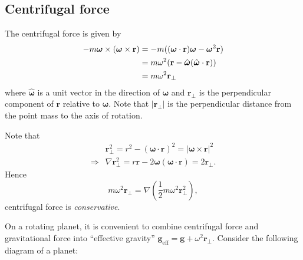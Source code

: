 \subsection{Centrifugal force}
The centrifugal force is given by 
\begin{align*}
    -m\boldsymbol{\omega} \times (\boldsymbol{\omega} \times \mathbf{r}) &= -m((\boldsymbol{\omega}\cdot \mathbf{r})\boldsymbol{\omega}-\boldsymbol{\omega}^2 \mathbf{r})\\ 
    &= m \omega^2({\bf r} - \hat{\boldsymbol{\omega}}(\hat{\boldsymbol{\omega}} \cdot \mathbf{r}))\\ 
    &= m \omega^2 \mathbf{r}_{\perp}
\end{align*}
where $ \hat{\boldsymbol{\omega}} $ is a unit vector in the direction of $ \boldsymbol{\omega} $ and $ \mathbf{r}_{\perp } $ is the perpendicular component of $ \mathbf{r} $ relative to $ \boldsymbol{\omega} $. Note that $ |\mathbf{r}_{\perp }|  $ is the perpendicular distance from the point mass to the axis of rotation.
\begin{center}
\end{center}
Note that
\begin{align*}
    & \mathbf{r}_\perp^2 = r^2-(\boldsymbol{\omega}\cdot \mathbf{r})^2 = |\boldsymbol{\omega}\times \mathbf{r}|^2\\ 
    \Longrightarrow & \nabla \mathbf{r}_\perp^2 = r \mathbf{r} - 2 \boldsymbol{\omega} (\boldsymbol{\omega}\cdot \mathbf{r}) = 2 \mathbf{r}_\perp.
\end{align*}
Hence 
\[
    m \omega^2 \mathbf{r}_{\perp} = \nabla \left( \frac{1}{2}m \omega^2 \mathbf{r}_\perp^2 \right),
\]
centrifugal force is \textit{conservative}. 

On a rotating planet, it is convenient to combine centrifugal force and gravitational force into ``effective gravity'' $ \mathbf{g}_{\text{eff}}=\mathbf{g}+\omega^2 \mathbf{r}_\perp  $. Consider the following diagram of a planet:
\begin{center}
\end{center}

